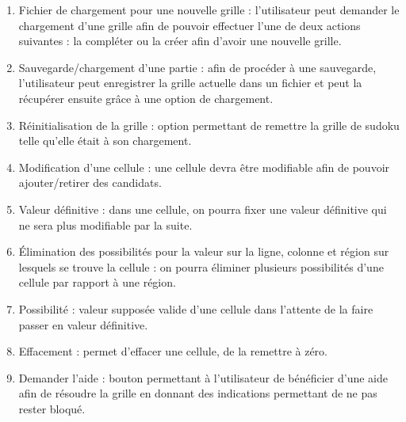 \begin{enumerate}
  
  \item Fichier de chargement pour une nouvelle grille :
  l'utilisateur peut demander le chargement d'une grille afin 
  de pouvoir effectuer l'une de deux actions suivantes : 
  la compléter ou la créer afin d'avoir une nouvelle grille. \\
  
  \item Sauvegarde/chargement d’une partie :
  afin de procéder à une sauvegarde, l'utilisateur peut enregistrer la grille actuelle 
  dans un fichier et peut la récupérer ensuite grâce à une option de chargement. \\
  
  \item Réinitialisation de la grille :
  option permettant de remettre la grille de sudoku telle qu'elle était à son chargement. \\
  
  \item Modification d’une cellule :
  une cellule devra être modifiable afin de pouvoir ajouter/retirer des candidats. \\
  
  \item Valeur définitive :
  dans une cellule, on pourra fixer une valeur définitive qui ne sera plus modifiable par la suite. \\
  
  \item Élimination des possibilités pour la valeur sur la ligne, colonne et
  région sur lesquels se trouve la cellule :
  on pourra éliminer plusieurs possibilités d'une cellule par rapport à une région. \\
  
  \item Possibilité : valeur supposée valide d'une cellule dans l'attente de la faire passer en valeur définitive. \\
  
  \item Effacement : permet d'effacer une cellule, de la remettre à zéro. \\
  
  \item Demander l’aide : bouton permettant à l'utilisateur de bénéficier d'une aide 
  afin de résoudre la grille en donnant des indications permettant de ne pas rester bloqué. \\
  

\end{enumerate}
